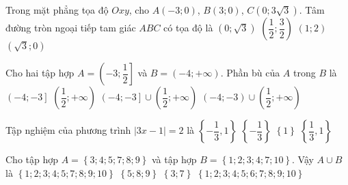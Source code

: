 \begin{ex}%
	Trong mặt phẳng tọa độ $Oxy$, cho $A(-3;0)$, $B(3;0)$, $C(0;3\sqrt{3})$. Tâm đường tròn ngoại tiếp tam giác $ABC$ có tọa độ là
	\choice
	{\True $\left( 0;\sqrt{3}\right)$}
	{$\left( \dfrac{1}{2};\dfrac{3}{2}\right)$}
	{$\left( 1;2\right)$}
	{$\left( \sqrt{3};0\right)$}
\end{ex}

\begin{ex}%
	Cho hai tập hợp $A=\left( -3;\dfrac{1}{2}\right]$ và  $B=\left( -4;+\infty \right)$. Phần bù của $A$ trong $B$ là
	\choice
	{$\left( -4;-3\right]$}
	{$\left( \dfrac{1}{2};+\infty \right)$}
	{\True $\left( -4;-3\right] \cup \left( \dfrac{1}{2};+\infty \right)$}
	{$\left( -4;-3\right) \cup \left( \dfrac{1}{2};+\infty \right)$}
	\loigiai{
		$\mathrm{C}_B A=B\setminus A= \left( -4;-3\right] \cup \left( \dfrac{1}{2};+\infty \right)$.		
	}
\end{ex}

\begin{ex}%
	Tập nghiệm của phương trình $ \left| 3x-1\right|=2$ là
	\choice
	{\True $\left\lbrace {-\dfrac{1}{3}, 1} \right\rbrace $}
	{$\left\lbrace {-\dfrac{1}{3}} \right\rbrace $}
	{$\left\lbrace {1} \right\rbrace $}
	{$\left\lbrace {\dfrac{1}{3}, 1} \right\rbrace $}
\end{ex}

\begin{ex}%
	Cho tập hợp $A=\left\lbrace {3;4;5;7;8;9} \right\rbrace $ và tập hợp $B=\left\lbrace {1;2;3;4;7;10} \right\rbrace $. Vậy $A\cup B$ là  
	\choice
	{\True $\left\lbrace {1;2;3;4;5;7;8;9;10} \right\rbrace $}
	{$\left\lbrace {5;8;9} \right\rbrace $}
	{$\left\lbrace {3;7} \right\rbrace $}
	{$\left\lbrace {1;2;3;4;5;6;7;8;9;10} \right\rbrace $}
\end{ex}

